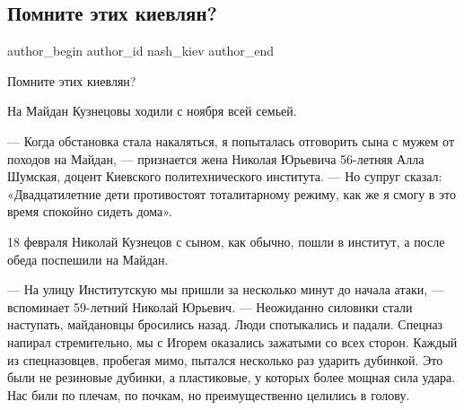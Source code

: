  
 
 
 
 
 
\subsection{Помните этих киевлян?}
\label{sec:22_11_2014.fb.nash_kiev.1.pomnite_etih_kievljan}
 
\ifcmt
 author_begin
   author_id nash_kiev
 author_end
\fi

Помните этих киевлян?

На Майдан Кузнецовы ходили с ноября всей семьей.

— Когда обстановка стала накаляться, я попыталась отговорить сына с мужем от
походов на Майдан, — признается жена Николая Юрьевича 56-летняя Алла Шумская,
доцент Киевского политехнического института. — Но супруг сказал:
«Двадцатилетние дети противостоят тоталитарному режиму, как же я смогу в это
время спокойно сидеть дома».

18 февраля Николай Кузнецов с сыном, как обычно, пошли в институт, а после
обеда поспешили на Майдан.

\zzrule

\begin{multicols}{2}
\end{multicols}

\zzrule

— На улицу Институтскую мы пришли за несколько минут до начала атаки, —
вспоминает 59-летний Николай Юрьевич. — Неожиданно силовики стали наступать,
майдановцы бросились назад. Люди спотыкались и падали. Спецназ напирал
стремительно, мы с Игорем оказались зажатыми со всех сторон. Каждый из
спецназовцев, пробегая мимо, пытался несколько раз ударить дубинкой. Это были
не резиновые дубинки, а пластиковые, у которых более мощная сила удара. Нас
били по плечам, по почкам, но преимущественно целились в голову.

